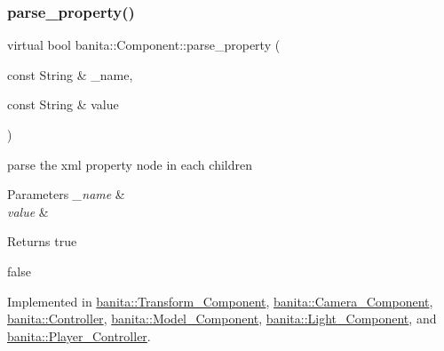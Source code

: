 \mbox{\label{classbanita_1_1_component_a619154ef2bed8e4493413bdef6117716}} 
\subsubsection{\texorpdfstring{parse\_property()}{parse\_property()}}
{\footnotesize\ttfamily virtual bool banita\+::\+Component\+::parse\+\_\+property (\begin{DoxyParamCaption}\item[{const String \&}]{\+\_\+name,  }\item[{const String \&}]{value }\end{DoxyParamCaption})\hspace{0.3cm}{\ttfamily [pure virtual]}}



parse the xml property node in each children 


\begin{DoxyParams}{Parameters}
{\em \+\_\+name} & \\
\hline
{\em value} & \\
\hline
\end{DoxyParams}
\begin{DoxyReturn}{Returns}
true 

false 
\end{DoxyReturn}


Implemented in \mbox{\hyperlink{classbanita_1_1_transform___component_a0f3ace424235b3992e01dbddfe85f088}{banita\+::\+Transform\+\_\+\+Component}}, \mbox{\hyperlink{classbanita_1_1_camera___component_a1f494aa6cd8edcbe61866dc5e053c6be}{banita\+::\+Camera\+\_\+\+Component}}, \mbox{\hyperlink{classbanita_1_1_controller_a74933400a4ed56e68ce5cb11ec395a1b}{banita\+::\+Controller}}, \mbox{\hyperlink{classbanita_1_1_model___component_a1a6acbf643bd87acabfc2a31b7be4db8}{banita\+::\+Model\+\_\+\+Component}}, \mbox{\hyperlink{classbanita_1_1_light___component_aa808026256f8f1050a1a90cc3b6a0602}{banita\+::\+Light\+\_\+\+Component}}, and \mbox{\hyperlink{classbanita_1_1_player___controller_ab25a1e791ce020ff226b6324cc2c5c67}{banita\+::\+Player\+\_\+\+Controller}}.

\mbox{\label{classbanita_1_1_component_a8a88347900a1cbfbc8069c57ce162abd}} 
